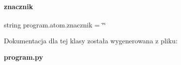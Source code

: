 \mbox{\label{classprogram_1_1atom_afe185225ad7639dd04e80a7a99916e6b}} 
\paragraph{znacznik}
{\footnotesize\ttfamily string program.\+atom.\+znacznik = \char`\"{}\char`\"{}\hspace{0.3cm}{\ttfamily [static]}}



Dokumentacja dla tej klasy została wygenerowana z pliku\+:\begin{DoxyCompactItemize}
\item 
\textbf{ program.\+py}\end{DoxyCompactItemize}
